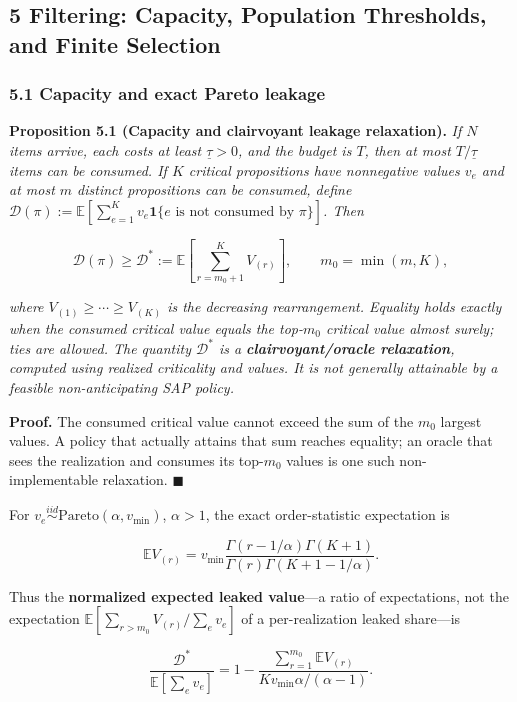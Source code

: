 \documentclass[
  11pt]{article}
\begin{document}
\subsection{5 Filtering: Capacity, Population Thresholds, and Finite
Selection}\label{filtering-capacity-population-thresholds-and-finite-selection}

\subsubsection{5.1 Capacity and exact Pareto
leakage}\label{capacity-and-exact-pareto-leakage}

\textbf{Proposition 5.1 (Capacity and clairvoyant leakage relaxation).}
\emph{If \(N\) items arrive, each costs at least \(\underline\tau>0\),
and the budget is \(T\), then at most \(T/\underline\tau\) items can be
consumed. If \(K\) critical propositions have nonnegative values \(v_e\)
and at most \(m\) distinct propositions can be consumed, define
\(\mathcal D(\pi):=\mathbb E[\sum_{e=1}^Kv_e\mathbf 1\{e\text{ is not consumed by }\pi\}]\).
Then}

\[\mathcal D(\pi)\ge\mathcal D^*:=\mathbb E\!\left[\sum_{r=m_0+1}^{K}V_{(r)}\right],\qquad m_0=\min(m,K),\tag{5}\]

\emph{where \(V_{(1)}\ge\cdots\ge V_{(K)}\) is the decreasing
rearrangement. Equality holds exactly when the consumed critical value
equals the top-\(m_0\) critical value almost surely; ties are allowed.
The quantity \(\mathcal D^*\) is a \textbf{clairvoyant/oracle
relaxation}, computed using realized criticality and values. It is not
generally attainable by a feasible non-anticipating SAP policy.}

\textbf{Proof.} The consumed critical value cannot exceed the sum of the
\(m_0\) largest values. A policy that actually attains that sum reaches
equality; an oracle that sees the realization and consumes its
top-\(m_0\) values is one such non-implementable relaxation.
\(\blacksquare\)

For \(v_e\overset{iid}{\sim}\mathrm{Pareto}(\alpha,v_{\min})\),
\(\alpha>1\), the exact order-statistic expectation is

\[\mathbb E V_{(r)}=v_{\min}\frac{\Gamma(r-1/\alpha)\Gamma(K+1)}{\Gamma(r)\Gamma(K+1-1/\alpha)}.\]

Thus the \textbf{normalized expected leaked value}---a ratio of
expectations, not the expectation
\(\mathbb E[\sum_{r>m_0}V_{(r)}/\sum_e v_e]\) of a per-realization
leaked share---is

\[\frac{\mathcal D^*}{\mathbb E[\sum_e v_e]}=1-\frac{\sum_{r=1}^{m_0}\mathbb E V_{(r)}}{Kv_{\min}\alpha/(\alpha-1)}.\tag{6}\]
\end{document}
